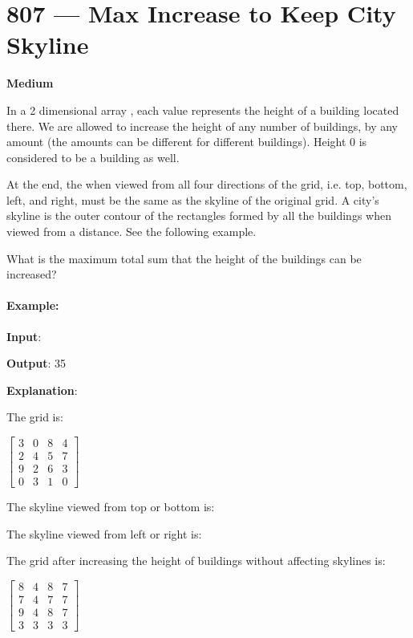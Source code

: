 \section{807 --- Max Increase to Keep City Skyline}

\textbf{Medium}

In a 2 dimensional array , each value  represents the height of a building located there. We are allowed to increase the height of any number of buildings, by any amount (the amounts can be different for different buildings). Height 0 is considered to be a building as well. 

At the end, the  when viewed from all four directions of the grid, i.e. top, bottom, left, and right, must be the same as the skyline of the original grid. A city's skyline is the outer contour of the rectangles formed by all the buildings when viewed from a distance. See the following example.

What is the maximum total sum that the height of the buildings can be increased?

\paragraph{Example:}

\begin{flushleft}
\textbf{Input}: 

\textbf{Output}: 35

\textbf{Explanation}: 

The grid is:

$
\begin{bmatrix}
3 & 0 & 8 & 4 \\
2 & 4 & 5 & 7 \\
9 & 2 & 6 & 3 \\
0 & 3 & 1 & 0
\end{bmatrix}
$

The skyline viewed from top or bottom is: \fcj{[9, 4, 8, 7]}

The skyline viewed from left or right is: \fcj{[8, 7, 9, 3]}

The grid after increasing the height of buildings without affecting skylines is:

$
\begin{bmatrix}
8 & 4 & 8 & 7\\
7 & 4 & 7 & 7\\
9 & 4 & 8 & 7\\
3 & 3 & 3 & 3
\end{bmatrix}
$

\end{flushleft}

